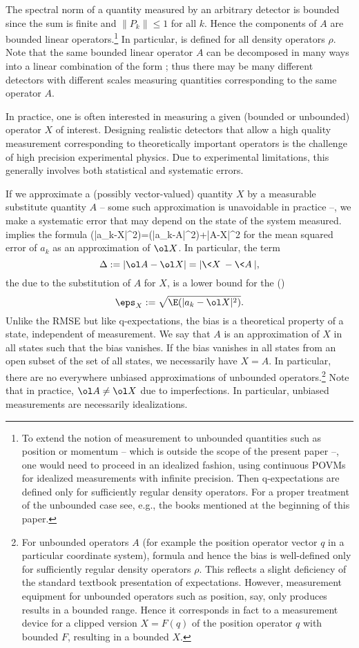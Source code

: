 \documentclass[12pt]{article}
\begin{document}
\bigskip

The spectral norm of a quantity measured by an arbitrary detector is
bounded since the sum  is finite and $\|P_k\|\le 1$ for all
$k$. Hence the components of $A$ are bounded linear
operators.\footnote{
To extend the notion of measurement to unbounded quantities such as
position or momentum -- which is outside the scope of the present paper
--, one would need to proceed in an idealized fashion, using continuous
POVMs for idealized measurements with infinite precision. Then
q-expectations are defined only for sufficiently regular density
operators. For a proper treatment of the unbounded case see, e.g., the 
books mentioned at the beginning of this paper.
} %
In particular,  is defined for all
density operators $\rho$. Note that the same bounded linear operator
$A$ can be decomposed in many ways into a linear combination of the
form ; thus there may be many different detectors with
different scales measuring quantities corresponding to the same
operator $A$.


In practice, one is often interested in measuring a given (bounded or
unbounded) operator $X$ of interest. Designing realistic detectors that
allow a high quality measurement corresponding to theoretically
important operators is the challenge of high precision experimental
physics. Due to experimental limitations, this generally involves both
statistical and systematic errors.

If we approximate a (possibly vector-valued) quantity $X$ by a
measurable substitute quantity $A$ -- some such approximation is
unavoidable in practice --, we make a systematic error that may depend 
on the state of the system measured.  implies the formula
\E(|a_k-\ol X|^2)=\E(|a_k-\ol A|^2)+|\ol A-\ol X|^2
\eeq
for the mean squared error of $a_k$ as an approximation of $\ol X$.
In particular, the term
\[
\Delta:=|\ol A-\ol X|=|\<X\>-\<A\>|,
\]
the  due to the substitution of $A$ for $X$, is a lower bound
for the  ()
\[
\eps_X:=\sqrt{\E(|a_k-\ol X|^2)}.
\]
Unlike the RMSE but like q-expectations, the bias is a theoretical
property of a state, independent of measurement.
We say that $A$ is an  approximation of $X$ in all states
such that the bias vanishes. If the bias vanishes in all states from an
open subset of the set of all states, we necessarily have $X=A$.
In particular, there are no everywhere unbiased approximations of
unbounded operators.\footnote{
For unbounded operators $A$ (for example the position operator vector
$q$ in a particular coordinate system), formula  and
hence the bias is well-defined only for sufficiently regular density
operators $\rho$. This reflects a slight deficiency of the standard
textbook presentation of expectations. However,
measurement equipment for unbounded operators such as position, say,
only produces results in a bounded range. Hence it corresponds in fact
to a measurement device for a clipped version $X=F(q)$ of the
position operator $q$ with bounded $F$, resulting in a bounded $X$.
} %
Note that in practice, $\ol A \ne \ol X$ due to imperfections.
In particular, unbiased measurements are necessarily idealizations.
\end{document}

